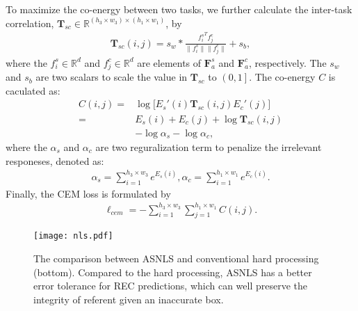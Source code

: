 \documentclass[10pt,twocolumn,letterpaper]{article}
\begin{document}
To maximize the co-energy between two tasks, we further calculate the inter-task correlation, $\mathbf{T}_{sc}\in \mathbb{R}^{(h_3 \times w_3)\times (h_1 \times w_1)}$, by 
\begin{equation}
\begin{aligned}
\mathbf{T}_{sc}(i,j)=s_w*\frac{{f_{i}^s}^T {f_{j}^c}}{{ \| {f_{i}^s}  \|}{  \| {f_{j}^c}  \|}}+s_b, 
\end{aligned}
\end{equation}
where the $f_{i}^s \in \mathbb{R}^{d} $ and $f_{j}^c \in \mathbb{R}^{d}$ are elements of  $\mathbf{F}_{a}^s$ and $\mathbf{F}_{a}^c$, respectively. The $s_w$ and $s_b$ are two scalars to scale the value in $\mathbf{T}_{sc}$ to $\left(0,1 \right]$.
The  co-energy $C$  is caculated as: 
\begin{equation}
\begin{aligned}
C\left(i,j\right)=&  \log \big[E_s'\left(i\right)\mathbf{T}_{sc}\left(i,j\right)E_c'\left(j\right)\big]\\
=& E_s\left(i\right) + E_c\left(j\right) +\log \mathbf{T}_{sc}\left(i,j\right)\\& - \log 
\alpha_s- \log \alpha_c,
\end{aligned}	
\end{equation}
where the $\alpha_s$ and $\alpha_c$ are two reguralization term to penalize  the irrelevant responeses, denoted as:
\begin{equation}
\begin{aligned}
\alpha_s=\sum_{i=1}^{h_3\times w_3}e^{E_s\left(i\right)}, \alpha_c=\sum_{i=1}^{h_1\times w_1}e^{E_c\left(i\right)}.
\end{aligned}	
\end{equation}
Finally, the CEM loss is formulated by 
\begin{equation}
\begin{aligned}
\ell_{cem}=-\sum_{i=1}^{h_3\times w_3}\sum_{j=1}^{h_1 \times w_1}C(i,j).
\end{aligned}	
\label{cem_loss}
\end{equation}
\begin{figure}[t]
	\centering
	\texttt{[image: nls.pdf]}
\caption{The comparison between ASNLS and conventional hard processing (bottom).  Compared to the hard processing,  ASNLS has a better error tolerance for REC predictions, which can well  preserve the integrity of  referent given an inaccurate box.}
	\label{fig3} 
	\vspace{-2em}
\end{figure}
\end{document}
